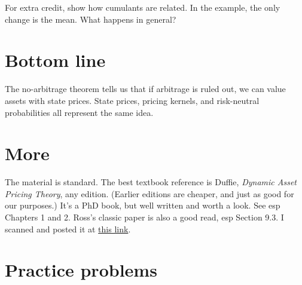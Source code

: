 \documentclass[11pt]{article}
\begin{document}
For extra credit, show how cumulants are related.
In the example, the only change is the mean.
What happens in general?


\section*{Bottom line}

The no-arbitrage theorem tells us that if arbitrage is ruled out,
we can value assets with state prices.
State prices, pricing kernels, and risk-neutral probabilities all represent
the same idea.


\section*{More}

The material is standard.
The best textbook reference is Duffie, {\it Dynamic Asset Pricing Theory\/}, any edition.
(Earlier editions are cheaper, and just as good for our purposes.)
It's a PhD book, but well written and worth a look.
See esp Chapters 1 and 2.
Ross's classic paper is also a good read, esp Section 9.3.
I scanned and posted it at
\href{http://pages.stern.nyu.edu/~dbackus/233/SteveRoss_risk-arb_chapter_1977.pdf}{this link}.


\section*{Practice problems}
\end{document}
